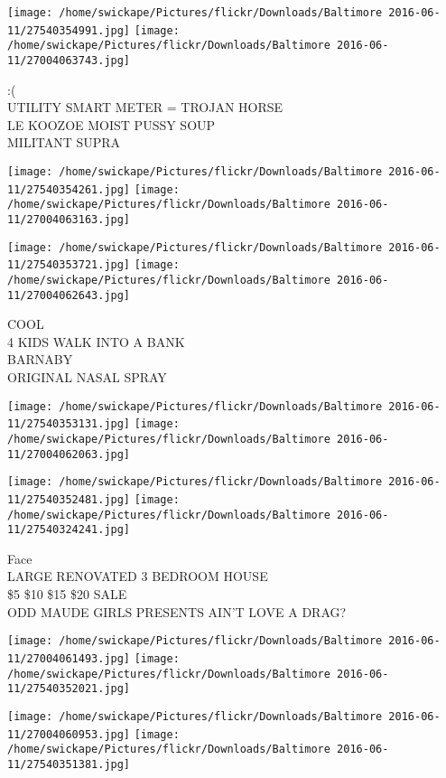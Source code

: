 \documentclass[10pt,letterpaper]{article}
\begin{document}
\texttt{[image: /home/swickape/Pictures/flickr/Downloads/Baltimore 2016-06-11/27540354991.jpg]}
\texttt{[image: /home/swickape/Pictures/flickr/Downloads/Baltimore 2016-06-11/27004063743.jpg]}

:(\\
UTILITY SMART METER = TROJAN HORSE\\
LE KOOZOE MOIST PUSSY SOUP\\
MILITANT SUPRA
\pagebreak

\texttt{[image: /home/swickape/Pictures/flickr/Downloads/Baltimore 2016-06-11/27540354261.jpg]}
\texttt{[image: /home/swickape/Pictures/flickr/Downloads/Baltimore 2016-06-11/27004063163.jpg]}

\texttt{[image: /home/swickape/Pictures/flickr/Downloads/Baltimore 2016-06-11/27540353721.jpg]}
\texttt{[image: /home/swickape/Pictures/flickr/Downloads/Baltimore 2016-06-11/27004062643.jpg]}

COOL\\
4 KIDS WALK INTO A BANK\\
BARNABY\\
ORIGINAL NASAL SPRAY
\pagebreak

\texttt{[image: /home/swickape/Pictures/flickr/Downloads/Baltimore 2016-06-11/27540353131.jpg]}
\texttt{[image: /home/swickape/Pictures/flickr/Downloads/Baltimore 2016-06-11/27004062063.jpg]}

\texttt{[image: /home/swickape/Pictures/flickr/Downloads/Baltimore 2016-06-11/27540352481.jpg]}
\texttt{[image: /home/swickape/Pictures/flickr/Downloads/Baltimore 2016-06-11/27540324241.jpg]}

Face\\
LARGE RENOVATED 3 BEDROOM HOUSE\\
\$5 \$10 \$15 \$20 SALE\\
ODD MAUDE GIRLS PRESENTS AIN'T LOVE A DRAG?
\pagebreak

\texttt{[image: /home/swickape/Pictures/flickr/Downloads/Baltimore 2016-06-11/27004061493.jpg]}
\texttt{[image: /home/swickape/Pictures/flickr/Downloads/Baltimore 2016-06-11/27540352021.jpg]}

\texttt{[image: /home/swickape/Pictures/flickr/Downloads/Baltimore 2016-06-11/27004060953.jpg]}
\texttt{[image: /home/swickape/Pictures/flickr/Downloads/Baltimore 2016-06-11/27540351381.jpg]}
\end{document}

